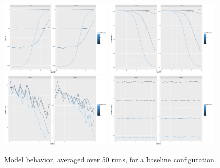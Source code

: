 \begin{figure}
\centering
\includegraphics[width=0.48\textwidth]{figures/baseline_indicdeltaU0}
\includegraphics[width=0.48\textwidth]{figures/baseline_indicindivMigrations}\\
\includegraphics[width=0.48\textwidth]{figures/baseline_indicjobDistance0}
\includegraphics[width=0.48\textwidth]{figures/baseline_indicutilitiesDecOrigin0_5}
\caption{Model behavior, averaged over 50 runs, for a baseline configuration.}
\label{fig:statistical-valid}
\end{figure}


